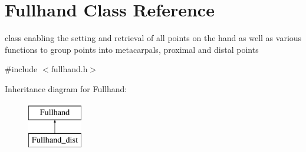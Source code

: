 \hypertarget{classFullhand}{
\section{Fullhand Class Reference}
\label{classFullhand}
}


class enabling the setting and retrieval of all points on the hand as well as various functions to group points into metacarpals, proximal and distal points  




{\ttfamily \#include $<$fullhand.h$>$}

Inheritance diagram for Fullhand:\begin{figure}[H]
\begin{center}
\leavevmode
\includegraphics[height=2.000000cm]{classFullhand}
\end{center}
\end{figure}
